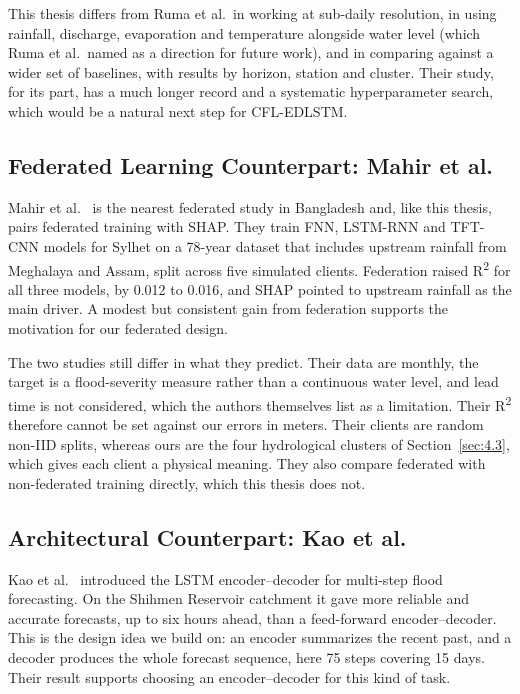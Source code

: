 This thesis differs from Ruma et al.\ in working at sub-daily resolution, in
using rainfall, discharge, evaporation and temperature alongside water level
(which Ruma et al.\ named as a direction for future work), and in comparing
against a wider set of baselines, with results by horizon, station and cluster.
Their study, for its part, has a much longer record and a systematic
hyperparameter search, which would be a natural next step for CFL-EDLSTM.

\subsection{Federated Learning Counterpart: Mahir et al.}
\label{sec:4.13.2}

Mahir et al.~\cite{Mahir2025} is the nearest federated study in Bangladesh and,
like this thesis, pairs federated training with SHAP. They train FNN, LSTM-RNN
and TFT-CNN models for Sylhet on a 78-year dataset that includes upstream
rainfall from Meghalaya and Assam, split across five simulated clients.
Federation raised R\textsuperscript{2} for all three models, by 0.012 to 0.016,
and SHAP pointed to upstream rainfall as the main driver. A modest but consistent
gain from federation supports the motivation for our federated design.

The two studies still differ in what they predict. Their data are monthly, the
target is a flood-severity measure rather than a continuous water level, and lead
time is not considered, which the authors themselves list as a limitation. Their
R\textsuperscript{2} therefore cannot be set against our errors in meters. Their
clients are random non-IID splits, whereas ours are the four hydrological
clusters of Section~\ref{sec:4.3}, which gives each client a physical meaning.
They also compare federated with non-federated training directly, which this
thesis does not.

\subsection{Architectural Counterpart: Kao et al.}
\label{sec:4.13.3}

Kao et al.~\cite{Kao2020} introduced the LSTM encoder--decoder for multi-step
flood forecasting. On the Shihmen Reservoir catchment it gave more reliable and
accurate forecasts, up to six hours ahead, than a feed-forward encoder--decoder.
This is the design idea we build on: an encoder summarizes the recent past, and a
decoder produces the whole forecast sequence, here 75 steps covering 15 days.
Their result supports choosing an encoder--decoder for this kind of task.


